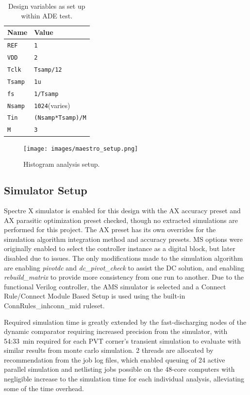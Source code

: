 \documentclass[11pt,letterpaper]{article}
\begin{document}
\begin{table}[htbp!]
    \centering
    \begin{tabular}{ll}
    \toprule
    \textbf{Name} & \textbf{Value} \\
    \midrule
        \texttt{REF} & \texttt{1} \\
        \texttt{VDD} & \texttt{2} \\
        \texttt{Tclk} & \texttt{Tsamp/12} \\
        \texttt{Tsamp} & \texttt{1u} \\
        \texttt{fs} & \texttt{1/Tsamp} \\
        \texttt{Nsamp} & \texttt{1024}\qquad(varies) \\
        \texttt{Tin} & \texttt{(Nsamp*Tsamp)/M} \\
        \texttt{M} & \texttt{3} \\
    \bottomrule
    \end{tabular}
    \caption{Design variables as set up within ADE test.}\label{tab:des_var}
\end{table}

\begin{figure}[htbp!]
		\centering
	    \texttt{[image: images/maestro\_setup.png]}
		\caption{Histogram analysis setup.}\label{fig:maestro}
\end{figure}

\subsection{Simulator Setup}

Spectre X simulator is enabled for this design with the AX accuracy preset and AX parasitic optimization preset checked, though no extracted simulations are performed for this project. The AX preset has its own overrides for the simulation algorithm integration method and accuracy presets. MS options were originally enabled to select the controller instance as a digital block, but later disabled due to issues. The only modifications made to the simulation algorithm are enabling \emph{pivotdc} and \emph{dc\_pivot\_check} to assist the DC solution, and enabling \emph{rebuild\_matrix} to provide more consistency from one run to another. Due to the functional Verilog controller, the AMS simulator is selected and a Connect Rule/Connect Module Based Setup is used using the built-in ConnRules\_inhconn\_mid ruleset.

Required simulation time is greatly extended by the fast-discharging nodes of the dynamic comparator requiring increased precision from the simulator, with 54:\qty{33}{min} required for each PVT corner's transient simulation to evaluate with similar results from monte carlo simulation. 2 threads are allocated by recommendation from the job log files, which enabled queuing of 24 active parallel simulation and netlisting jobs possible on the 48-core computers with negligible increase to the simulation time for each individual analysis, alleviating some of the time overhead.
\end{document}
